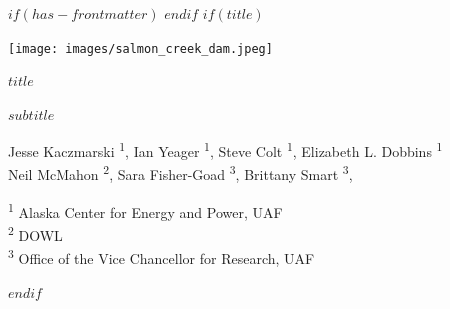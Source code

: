 
$if(has-frontmatter)$
\frontmatter
$endif$
$if(title)$
\cleardoublepage
\thispagestyle{empty}
{\centering

\vspace*{-3cm}


\vspace{5ex}

\par\noindent\hspace*{-1cm}\texttt{[image: images/salmon\_creek\_dam.jpeg]}

\vspace{5ex}


{\huge\bfseries\color{uafblue} $title$ \par}
\vspace{2ex}
{\large\bfseries\color{uafblue} $subtitle$ \par}

\vspace{5ex}

{\normalsize
  Jesse Kaczmarski \textsuperscript{1}, 
  Ian Yeager \textsuperscript{1}, 
  Steve Colt \textsuperscript{1},
  Elizabeth L. Dobbins \textsuperscript{1}\\
  Neil McMahon \textsuperscript{2}, 
  Sara Fisher-Goad \textsuperscript{3}, 
  Brittany Smart \textsuperscript{3}, 
}

\vspace{5ex}

{\large
  \textsuperscript{1} Alaska Center for Energy and Power, UAF \\
  \textsuperscript{2} DOWL \\
  \textsuperscript{3} Office of the Vice Chancellor for Research, UAF
}


}
$endif$


